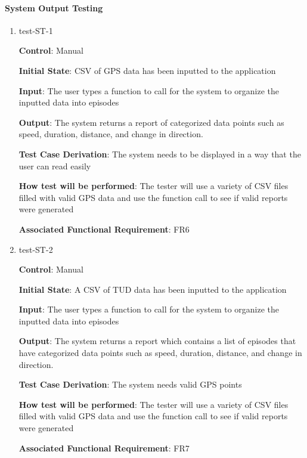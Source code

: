 \documentclass[12pt, titlepage]{article}
\begin{document}
\paragraph{System Output Testing}

\begin{enumerate}

\item{test-ST-1\\}

\textbf{Control}: Manual       
					
\textbf{Initial State}: CSV of GPS data has been inputted to the application
					
\textbf{Input}: The user types a function to call for the system to organize the inputted data into episodes 
					
\textbf{Output}: The system returns a report of categorized data points such as speed, duration, distance, and change in direction.

\textbf{Test Case Derivation}: The system needs to be displayed in a way that the user can read easily

\textbf{How test will be performed}: The tester will use a variety of CSV files filled with valid GPS data and use the function call to see if valid reports were generated


\textbf{Associated Functional Requirement}: FR6



\item{test-ST-2\\}

\textbf{Control}: Manual
					
\textbf{Initial State}: A CSV of TUD data has been inputted to the application
					
\textbf{Input}: The user types a function to call for the system to organize the inputted data into episodes 
					
\textbf{Output}: The system returns a report which contains a list of episodes that have categorized data points such as speed, duration, distance, and change in direction.

\textbf{Test Case Derivation}: The system needs valid GPS points

\textbf{How test will be performed}: The tester will use a variety of CSV files filled with valid GPS data and use the function call to see if valid reports were generated


\textbf{Associated Functional Requirement}: FR7


\end{enumerate}
\end{document}
